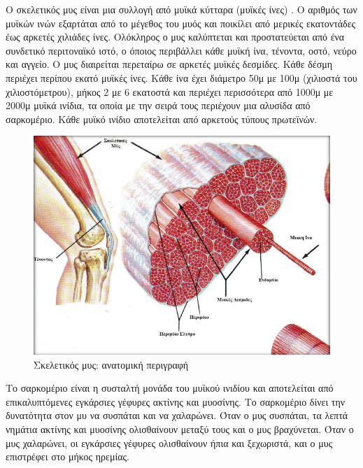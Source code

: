 Ο σκελετικός μυς είναι μια συλλογή από μυϊκά κύτταρα (μυϊκές ίνες) \cite{zirinoglou}. Ο αριθμός των μυϊκών ινών εξαρτάται από το μέγεθος του μυός και ποικίλει από μερικές εκατοντάδες έως αρκετές χιλιάδες ίνες. Ολόκληρος ο μυς καλύπτεται και προστατεύεται από ένα συνδετικό περιτοναϊκό ιστό, ο όποιος περιβάλλει κάθε μυϊκή ίνα, τένοντα, οστό, νεύρο και αγγείο. Ο μυς διαιρείται περεταίρω σε αρκετές μυϊκές δεσμίδες. Κάθε δέσμη περιέχει περίπου εκατό μυϊκές ίνες. Κάθε ίνα έχει διάμετρο 50μ με 100μ (χιλιοστά του χιλιοστόμετρου), μήκος 2 με 6 εκατοστά και περιέχει περισσότερα από 1000μ με 2000μ μυϊκά ινίδια, τα οποία με την σειρά τους περιέχουν μια αλυσίδα από σαρκομέριο. Κάθε μυϊκό ινίδιο αποτελείται από αρκετούς τύπους πρωτεϊνών.

\begin{figure}[H]
    \centering
    \includegraphics[width=.8\textwidth, height=0.5\textheight, keepaspectratio]{fig/muscle-fysiology.png}
    \caption{Σκελετικός μυς: ανατομική περιγραφή\protect\footnotemark}
    \label{fig:muscle-fysiology}
\end{figure}

Το σαρκομέριο είναι η συσταλτή μονάδα του μυϊκού ινιδίου και αποτελείται από επικαλυπτόμενες εγκάρσιες γέφυρες ακτίνης και μυοσίνης. Το σαρκομέριο δίνει την δυνατότητα στον μυ να συσπάται και να χαλαρώνει. Όταν ο μυς συσπάται, τα λεπτά νημάτια ακτίνης και μυοσίνης ολισθαίνουν μεταξύ τους και ο μυς βραχύνεται. Όταν ο μυς χαλαρώνει, οι εγκάρσιες γέφυρες ολισθαίνουν ήπια και ξεχωριστά, και ο μυς επιστρέφει στο μήκος ηρεμίας.

